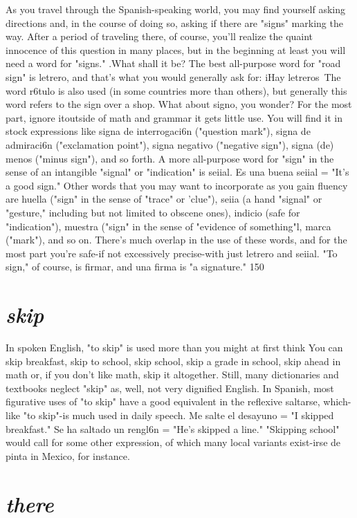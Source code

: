\documentclass[14pt,a4paper,oneside]{memoir}
\begin{document}
As you travel through the Spanish-speaking world, you may
find yourself asking directions and, in the course of doing so, asking if
there are "signs" marking the way. After a period of traveling there, of
course, you'll realize the quaint innocence of this question in many
places, but in the beginning at least you will need a word for "signs."
.What shall it be? The best all-purpose word for "road sign" is letrero,
and that's what you would generally ask for: iHay letreros~The word
r6tulo is also used (in some countries more than others), but generally
this word refers to the sign over a shop.
What about signo, you wonder? For the most part, ignore itoutside of math and grammar it gets little use. You will find it in stock
expressions like signa de interrogaci6n ("question mark"), signa de
admiraci6n ("exclamation point"), signa negativo ("negative sign"),
signa (de) menos ("minus sign"), and so forth. A more all-purpose word
for "sign" in the sense of an intangible "signal" or "indication" is seiial.
Es una buena seiial = "It's a good sign."
Other words that you may want to incorporate as you gain fluency are huella ("sign" in the sense of "trace" or 'clue"), seiia (a hand
"signal" or "gesture," including but not limited to obscene ones), indicio (safe for "indication"), muestra ("sign" in the sense of "evidence
of something"l, marca ("mark"), and so on. There's much overlap in
the use of these words, and for the most part you're safe-if not excessively precise-with just letrero and seiial. "To sign," of course, is firmar, and una firma is "a signature."
150

\section{\emph{skip}}

In spoken English, "to skip" is used more than you might at
first think You can skip breakfast, skip to school, skip school, skip a
grade in school, skip ahead in math or, if you don't like math, skip it
altogether. Still, many dictionaries and textbooks neglect "skip" as,
well, not very dignified English. In Spanish, most figurative uses of
"to skip" have a good equivalent in the reflexive saltarse, which-like
"to skip"-is much used in daily speech. Me salte el desayuno = "I
skipped breakfast." Se ha saltado un rengl6n = "He's skipped a line."
"Skipping school" would call for some other expression, of which
many local variants exist-irse de pinta in Mexico, for instance.

\section{\emph{there}}
\end{document}
